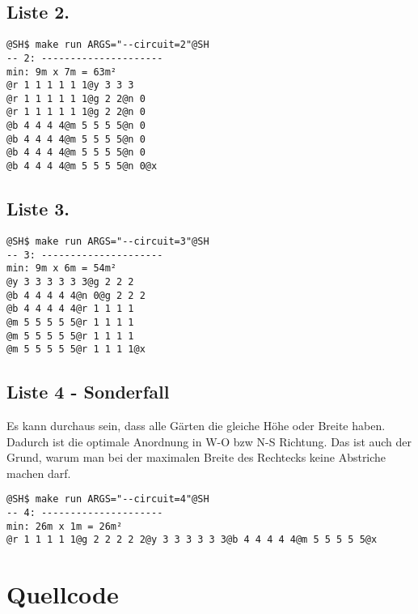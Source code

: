 \documentclass[a4paper,10pt,ngerman]{scrartcl}
\begin{document}
\subsection{Liste 2.}
\begin{lstlisting}
@SH$ make run ARGS="--circuit=2"@SH
-- 2: ---------------------
min: 9m x 7m = 63m²
@r 1 1 1 1 1 1@y 3 3 3
@r 1 1 1 1 1 1@g 2 2@n 0
@r 1 1 1 1 1 1@g 2 2@n 0
@b 4 4 4 4@m 5 5 5 5@n 0
@b 4 4 4 4@m 5 5 5 5@n 0
@b 4 4 4 4@m 5 5 5 5@n 0
@b 4 4 4 4@m 5 5 5 5@n 0@x
\end{lstlisting}

\subsection{Liste 3.}
\begin{lstlisting}
@SH$ make run ARGS="--circuit=3"@SH
-- 3: ---------------------
min: 9m x 6m = 54m²
@y 3 3 3 3 3 3@g 2 2 2
@b 4 4 4 4 4@n 0@g 2 2 2
@b 4 4 4 4 4@r 1 1 1 1
@m 5 5 5 5 5@r 1 1 1 1
@m 5 5 5 5 5@r 1 1 1 1
@m 5 5 5 5 5@r 1 1 1 1@x
\end{lstlisting}

\subsection{Liste 4 - Sonderfall}
Es kann durchaus sein, dass alle Gärten die gleiche Höhe oder Breite haben. Dadurch ist die optimale Anordnung in W-O bzw N-S Richtung. Das ist auch der Grund, warum man bei der maximalen Breite des Rechtecks keine Abstriche machen darf.
\begin{lstlisting}
@SH$ make run ARGS="--circuit=4"@SH
-- 4: ---------------------
min: 26m x 1m = 26m²
@r 1 1 1 1 1@g 2 2 2 2 2@y 3 3 3 3 3 3@b 4 4 4 4 4@m 5 5 5 5 5@x
\end{lstlisting}


\pagebreak
\section{Quellcode}
\end{document}
